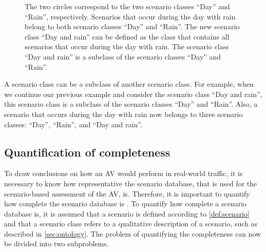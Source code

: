 \setlength{\venncircle}{10em}
\begin{figure}
	\centering
	\caption{The two circles correspond to the two scenario classes ``Day'' and ``Rain'', respectively. Scenarios that occur during the day with rain belong to both scenario classes ``Day'' and ``Rain''. The new scenario class ``Day and rain'' can be defined as the class that contains all scenarios that occur during the day with rain. The scenario class ``Day and rain'' is a subclass of the scenario classes ``Day'' and ``Rain''.}
	\label{fig:venn diagram scenario class}
\end{figure}

A scenario class can be a subclass of another scenario class. For example, when we continue our previous example and consider the scenario class ``Day and rain'', this scenario class is a subclass of the scenario classes ``Day'' and ``Rain''. Also, a scenario that occurs during the day with rain now belongs to three scenario classes: ``Day'', ``Rain'', and ``Day and rain''.

\subsection{Quantification of completeness}
\label{sec:completeness}

To draw conclusions on how an AV would perform in real-world traffic, it is necessary to know how representative the scenario database, that is used for the scenario-based assessment of the AV, is. Therefore, it is important to quantify how complete the scenario database is \cite{geyer2014, alvarez2017prospective, stellet2015taxonomy}. To quantify how complete a scenario database is, it is assumed that a scenario is defined according to \cref{def:scenario} and that a scenario class refers to a qualitative description of a scenario, such as described in \cref{sec:ontology}. The problem of quantifying the completeness can now be divided into two subproblems.


